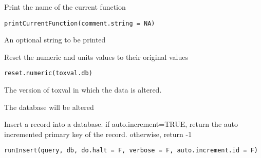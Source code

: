 \documentclass[letterpaper]{book}
\begin{document}
%
\begin{Description}\relax
Print the name of the current function
\end{Description}
%
\begin{Usage}
\begin{verbatim}
printCurrentFunction(comment.string = NA)
\end{verbatim}
\end{Usage}
%
\begin{Arguments}
\begin{ldescription}
\item[\code{comment.string}] An optional string to be printed
\end{ldescription}
\end{Arguments}
%
\begin{Description}\relax
Reset the numeric and units values to their original values
\end{Description}
%
\begin{Usage}
\begin{verbatim}
reset.numeric(toxval.db)
\end{verbatim}
\end{Usage}
%
\begin{Arguments}
\begin{ldescription}
\item[\code{toxval.db}] The version of toxval in which the data is altered.
\end{ldescription}
\end{Arguments}
%
\begin{Value}
The database will be altered
\end{Value}
%
\begin{Description}\relax
Insert a record into a database. if auto.increment=TRUE, return the auto incremented
primary key of the record. otherwise, return -1
\end{Description}
%
\begin{Usage}
\begin{verbatim}
runInsert(query, db, do.halt = F, verbose = F, auto.increment.id = F)
\end{verbatim}
\end{Usage}
%
\end{document}

